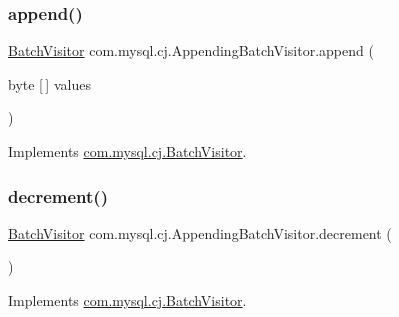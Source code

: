 \subsubsection{\texorpdfstring{append()}{append()}}
{\footnotesize\ttfamily \mbox{\hyperlink{interfacecom_1_1mysql_1_1cj_1_1_batch_visitor}{Batch\+Visitor}} com.\+mysql.\+cj.\+Appending\+Batch\+Visitor.\+append (\begin{DoxyParamCaption}\item[{byte \mbox{[}$\,$\mbox{]}}]{values }\end{DoxyParamCaption})}



Implements \mbox{\hyperlink{interfacecom_1_1mysql_1_1cj_1_1_batch_visitor_a7f758e88adb5d36fe9b47dfbee4377a8}{com.\+mysql.\+cj.\+Batch\+Visitor}}.

\mbox{\label{classcom_1_1mysql_1_1cj_1_1_appending_batch_visitor_a1f3469887d7b40e881ceb47bb912ec07}} 
\subsubsection{\texorpdfstring{decrement()}{decrement()}}
{\footnotesize\ttfamily \mbox{\hyperlink{interfacecom_1_1mysql_1_1cj_1_1_batch_visitor}{Batch\+Visitor}} com.\+mysql.\+cj.\+Appending\+Batch\+Visitor.\+decrement (\begin{DoxyParamCaption}{ }\end{DoxyParamCaption})}



Implements \mbox{\hyperlink{interfacecom_1_1mysql_1_1cj_1_1_batch_visitor_ad9fc024937c7d03fe39f3c4f1a6a5069}{com.\+mysql.\+cj.\+Batch\+Visitor}}.

\mbox{\label{classcom_1_1mysql_1_1cj_1_1_appending_batch_visitor_a3f735090eea41d6ecc28c9d0c24e170a}} 
